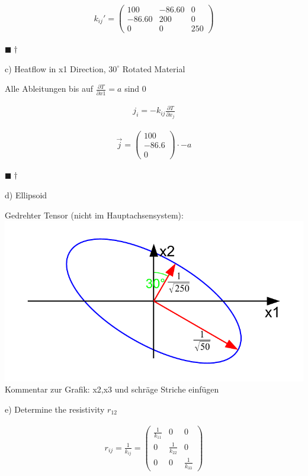 \documentclass[a4paper, 10pt]{scrartcl}
\newcommand{\qed}{\begin{flushright}
		$\blacksquare \dagger$ \end{flushright}}
\begin{document}
\begin{align}
	k_{ij}'=\begin{pmatrix}
		100 & -86.60 & 0 \\
		-86.60 & 200 & 0 \\
		0 & 0 & 250
	\end{pmatrix}
\end{align}
\qed

c) Heatflow in x1 Direction, $30^\circ$ Rotated Material

Alle Ableitungen bis auf $\frac{\partial T}{\partial x1}=a$ sind 0


\begin{align}
	j_i=-k_{ij} \frac{\partial T}{\partial x_j}
\end{align}

\begin{align}
	\vec{j}=\begin{pmatrix}
		100 \\
		-86.6 \\
		0
	\end{pmatrix}
	\cdot -a
\end{align}

\qed
d) Ellipsoid

\begin{center}
	Gedrehter Tensor (nicht im Hauptachsensystem):\\
	\includegraphics[scale=0.8]{images/quadrik_2d_ellipse_uebung_rotation.pdf}\\
	Kommentar zur Grafik: x2,x3 und schräge Striche einfügen\\
\end{center}

e) Determine the resistivity $r_{12}$

\begin{align}
	r_{ij}=\frac{1}{k_{ij}}=\begin{pmatrix}
		\frac{1}{k_{11}} & 0 & 0 \\
		0 & \frac{1}{k_{22}} & 0 \\
		0 & 0 & \frac{1}{k_{33}}
	\end{pmatrix}
\end{align}
\end{document}
